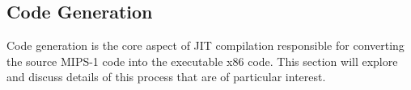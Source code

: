 \subsection{Code Generation}

Code generation is the core aspect of JIT compilation responsible for converting the source MIPS-1 code into the executable x86 code. This section will explore and discuss details of this process that are of particular interest.





